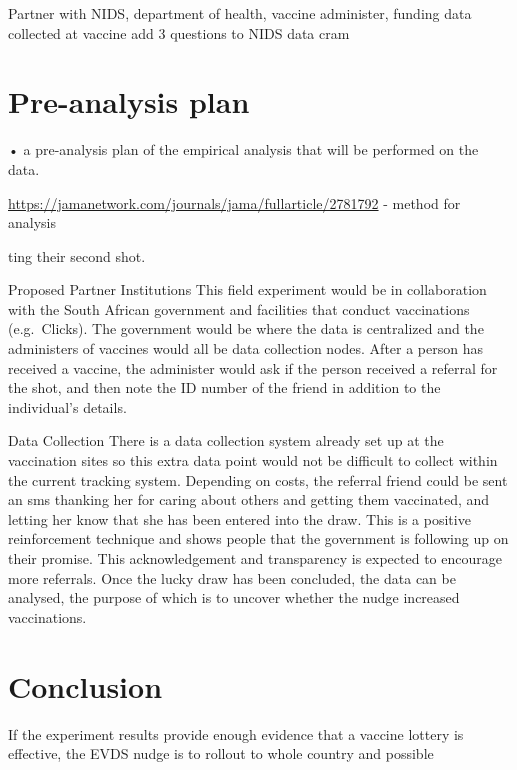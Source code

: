 \documentclass[11pt,preprint, authoryear]{elsarticle}
\numberwithin{equation}{section}
\numberwithin{figure}{section}
\numberwithin{table}{section}
\begin{document}
Partner with NIDS, department of health, vaccine administer, funding
data collected at vaccine add 3 questions to NIDS data cram

\hypertarget{pre-analysis-plan}{%
\section{\texorpdfstring{Pre-analysis plan
\label{pre}}{Pre-analysis plan }}\label{pre-analysis-plan}}

• a pre-analysis plan of the empirical analysis that will be performed
on the data.

\url{https://jamanetwork.com/journals/jama/fullarticle/2781792} - method
for analysis

ting their second shot.

Proposed Partner Institutions This field experiment would be in
collaboration with the South African government and facilities that
conduct vaccinations (e.g.~Clicks). The government would be where the
data is centralized and the administers of vaccines would all be data
collection nodes. After a person has received a vaccine, the administer
would ask if the person received a referral for the shot, and then note
the ID number of the friend in addition to the individual's details.

Data Collection There is a data collection system already set up at the
vaccination sites so this extra data point would not be difficult to
collect within the current tracking system. Depending on costs, the
referral friend could be sent an sms thanking her for caring about
others and getting them vaccinated, and letting her know that she has
been entered into the draw. This is a positive reinforcement technique
and shows people that the government is following up on their promise.
This acknowledgement and transparency is expected to encourage more
referrals. Once the lucky draw has been concluded, the data can be
analysed, the purpose of which is to uncover whether the nudge increased
vaccinations.

\hfill

\hypertarget{conclusion}{%
\section{\texorpdfstring{Conclusion
\label{con}}{Conclusion }}\label{conclusion}}

If the experiment results provide enough evidence that a vaccine lottery
is effective, the EVDS nudge is to rollout to whole country and possible
\end{document}
